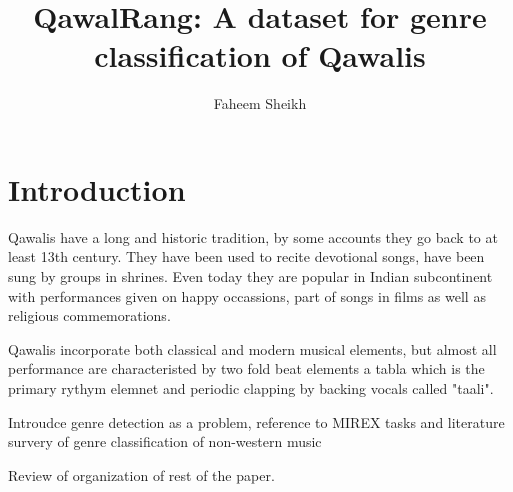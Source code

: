 \documentclass{article}
\title{QawalRang: A dataset for genre classification of Qawalis}
\author{%
Faheem Sheikh}%
\date{}
\begin{document}

\saythanks{}


\section{Introduction}\label{sec:intro}
Qawalis have a long and historic tradition, by some accounts they go back to at least 13th century. They have been used to recite devotional songs, have been sung by groups in shrines. Even today they are popular in Indian subcontinent with performances given on happy occassions, part of songs  in films as well as religious commemorations. 

Qawalis incorporate both classical and modern musical elements, but almost all performance are characteristed by two fold beat elements a tabla which is the primary rythym elemnet and periodic clapping by backing vocals called "taali".

Introudce genre detection as a problem, reference to MIREX tasks and literature survery of genre classification of non-western music

Review of organization of rest of the paper.
\end{document}
